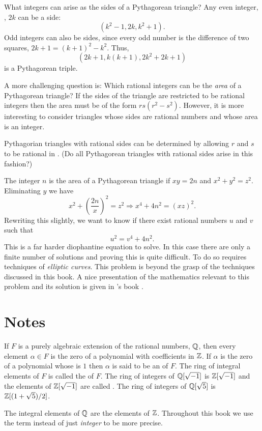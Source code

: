 What integers can arise as the sides of a Pythagorean triangle?  Any
even integer, \eg, $2k$ can be a side:
\[
(k^2 - 1 , 2k, k^2+1).
\]
Odd integers can also be sides, since every odd number is the difference
of two squares, $2k+1 = (k+1)^2 - k^2$.  Thus,
\[
(2k+1, k(k+1), 2k^2+2k +1)
\]
is a Pythagorean triple.

A more challenging question is: Which rational integers can be the
{\em area} of a Pythagorean triangle?  If the sides of the triangle
are restricted to be rational integers then the area must be of the
form $rs(r^2-s^2)$.  However, it is more interesting to consider
triangles whose sides are rational numbers and whose area is an
integer.

Pythagorian triangles with rational sides can be determined by
allowing $r$ and $s$ to be rational in .  (Do
all Pythagorean triangles with rational sides arise in this fashion?)

The integer $n$ is the area of a Pythagorean triangle if $xy = 2n$ and
$x^2 +y^2 = z^2$.  Eliminating $y$ we have
\[
x^2 + \left(\frac{2n}{x}\right)^2 = z^2 \Longrightarrow x^4 + 4n^2 =
(xz)^2.
\]
Rewriting this slightly, we want to know if there exist rational
numbers $u$ and $v$ such that
\begin{equation}\label{Euclid:Cong:Eq}
u^2 = v^4 + 4n^2.
\end{equation}
This is a far harder diophantine equation to solve.  In this case
there are only a finite number of solutions and proving this is quite
difficult.  To do so requires techniques of {\em elliptic
curves}. This problem is beyond the grasp of the
techniques discussed in this book.  A nice presentation of the
mathematics relevant to this problem and its solution is given in
{\Koblitz}'s book \cite{Koblitz:Elliptic}.

\section*{Notes}

\small

If $F$ is a purely algebraic extension of the rational numbers, $\mathbb{Q}$,
then every element $\alpha \in F$ is the zero of a polynomial with
coefficients in $\mathbb{Z}$.  If $\alpha$ is the zero of a polynomial whose
 is $1$ then $\alpha$ is said to be an
 of $F$.  The ring of integral elements of $F$
is called the  of $F$.  The ring of integers of
$\mathbb{Q}[\sqrt{-1}]$ is $\mathbb{Z}[\sqrt{-1}]$ and the elements of $\mathbb{Z}[\sqrt{-1}]$
are called .  The ring of integers of
$\mathbb{Q}[\sqrt{5}]$ is $\mathbb{Z}[(1+\sqrt{5})/2]$.

The integral elements of $\mathbb{Q}$ are the elements of $\mathbb{Z}$.  Throughout
this book we use the term  instead of just {\em
integer} to be more precise.

\normalsize
